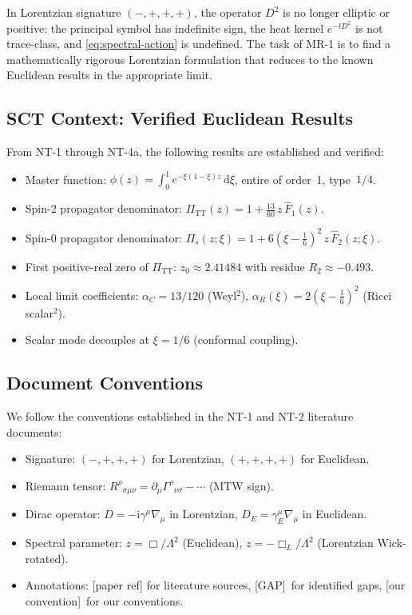 \documentclass[12pt,a4paper]{article}
\theoremstyle{definition}
\theoremstyle{remark}
\newcommand{\dd}{\mathrm{d}}
\newcommand{\ii}{\mathrm{i}}
\newcommand{\fromlit}[1]{\textcolor{blue!70!black}{\textsf{[#1]}}}
\newcommand{\oursign}{\textcolor{teal!80!black}{\textsf{[our convention]}}}
\newcommand{\gap}{\textcolor{red!80!black}{\textsf{[GAP]}}}
\begin{document}
In Lorentzian signature $(-,+,+,+)$, the operator $D^2$ is no longer
elliptic or positive: the principal symbol has indefinite sign, the
heat kernel $e^{-tD^2}$ is not trace-class, and \eqref{eq:spectral-action}
is undefined.  The task of MR-1 is to find a mathematically rigorous
Lorentzian formulation that reduces to the known Euclidean results in
the appropriate limit.

\subsection{SCT Context: Verified Euclidean Results}

From NT-1 through NT-4a, the following results are established and
verified:
\begin{itemize}[nosep]
  \item Master function:
    $\phi(z) = \int_0^1 e^{-\xi(1-\xi)z}\,\dd\xi$, entire of order~1,
    type~$1/4$.
  \item Spin-2 propagator denominator:
    $\Pi_{\mathrm{TT}}(z) = 1 + \frac{13}{60}\,z\,\hat{F}_1(z)$.
  \item Spin-0 propagator denominator:
    $\Pi_s(z;\xi) = 1 + 6(\xi - \tfrac{1}{6})^2\,z\,\hat{F}_2(z;\xi)$.
  \item First positive-real zero of $\Pi_{\mathrm{TT}}$:
    $z_0 \approx 2.41484$ with residue $R_2 \approx -0.493$.
  \item Local limit coefficients:
    $\alpha_C = 13/120$ (Weyl$^2$),
    $\alpha_R(\xi) = 2(\xi-\tfrac{1}{6})^2$ (Ricci scalar$^2$).
  \item Scalar mode decouples at $\xi = 1/6$ (conformal coupling).
\end{itemize}

\subsection{Document Conventions}

We follow the conventions established in the NT-1 and NT-2 literature
documents:
\begin{itemize}[nosep]
  \item Signature: $(-,+,+,+)$ for Lorentzian, $(+,+,+,+)$ for
    Euclidean.
  \item Riemann tensor: $R^\rho{}_{\sigma\mu\nu} =
    \partial_\mu\Gamma^\rho{}_{\nu\sigma} - \cdots$ (MTW sign).
  \item Dirac operator: $D = -\ii\gamma^\mu\nabla_\mu$ in Lorentzian,
    $D_E = \gamma^\mu_E \nabla_\mu$ in Euclidean.
  \item Spectral parameter: $z = \Box / \Lambda^2$ (Euclidean),
    $z = -\Box_L / \Lambda^2$ (Lorentzian Wick-rotated).
  \item Annotations: \fromlit{paper ref} for literature sources,
    \gap\ for identified gaps, \oursign\ for our conventions.
\end{itemize}
\end{document}
